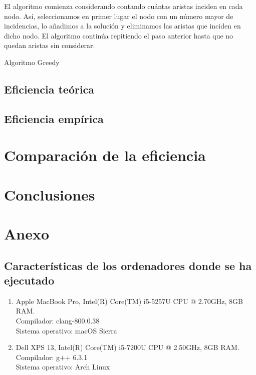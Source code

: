 \documentclass[11pt]{article}
\begin{document}
El algoritmo comienza considerando contando cuántas aristas inciden en cada nodo. Así, seleccionamos en primer lugar el nodo con un número mayor de incidencias, lo añadimos a la solución y eliminamos las aristas que inciden en dicho nodo. El algoritmo continúa repitiendo el paso anterior hasta que no quedan aristas sin considerar.

\begin{frame}{Algoritmo Greedy}
\end{frame}

\subsection*{Eficiencia teórica}


\subsection*{Eficiencia empírica}


\section*{Comparación de la eficiencia}


\section*{Conclusiones}


\newpage

\section*{Anexo}
\subsection*{Características de los ordenadores donde se ha ejecutado}

\vspace{0.5em}

\begin{enumerate}
\item Apple MacBook Pro, Intel(R) Core(TM) i5-5257U CPU @ 2.70GHz, 8GB RAM.\\  Compilador: clang-800.0.38 \\
  Sistema operativo: macOS Sierra
\item Dell XPS 13, Intel(R) Core(TM) i5-7200U CPU @ 2.50GHz, 8GB RAM.\\
  Compilador: g++ 6.3.1\\
  Sistema operativo: Arch Linux
\end{enumerate}
\end{document}
